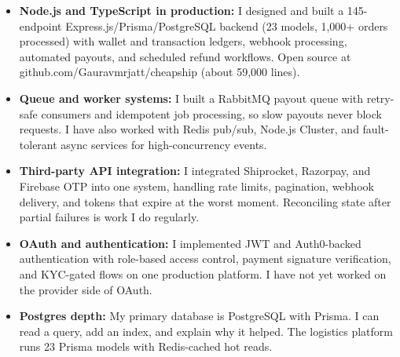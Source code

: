 \documentclass[]{cover}
\begin{document}

\currentdate{\today}



{\raggedright{}\fontsize{11pt}{13pt}\selectfont
\renewcommand{\labelitemi}{\textbullet}
\renewcommand{\labelitemii}{\textbullet}
\renewcommand{\labelitemiii}{\textbullet}
\begin{itemize}
    \item \textbf{Node.js and TypeScript in production:} I designed and built a 145-endpoint Express.js/Prisma/PostgreSQL backend (23 models, 1,000+ orders processed) with wallet and transaction ledgers, webhook processing, automated payouts, and scheduled refund workflows. Open source at github.com/Gauravmrjatt/cheapship (about 59,000 lines).
    \item \textbf{Queue and worker systems:} I built a RabbitMQ payout queue with retry-safe consumers and idempotent job processing, so slow payouts never block requests. I have also worked with Redis pub/sub, Node.js Cluster, and fault-tolerant async services for high-concurrency events.
    \item \textbf{Third-party API integration:} I integrated Shiprocket, Razorpay, and Firebase OTP into one system, handling rate limits, pagination, webhook delivery, and tokens that expire at the worst moment. Reconciling state after partial failures is work I do regularly.
    \item \textbf{OAuth and authentication:} I implemented JWT and Auth0-backed authentication with role-based access control, payment signature verification, and KYC-gated flows on one production platform. I have not yet worked on the provider side of OAuth.
    \item \textbf{Postgres depth:} My primary database is PostgreSQL with Prisma. I can read a query, add an index, and explain why it helped. The logistics platform runs 23 Prisma models with Redis-cached hot reads.
\end{itemize}\par}
\vspace{6pt}
\end{document}
